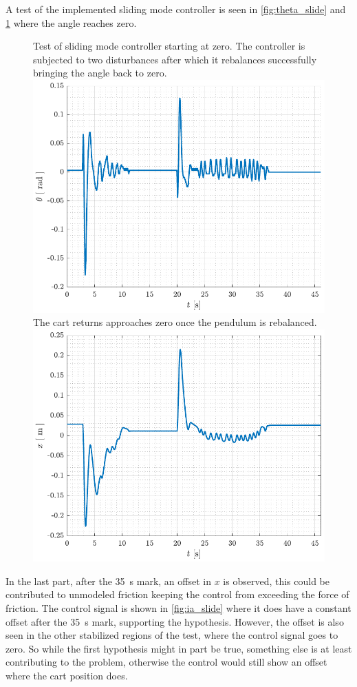 %
A test of the implemented sliding mode controller is seen in \autoref{fig:theta_slide} and \ref{fig:x_slide} where the angle reaches zero.
%
\begin{figure}[H]
  \hspace{1cm}
  \captionbox
  {
    Test of sliding mode controller starting at zero. The controller is subjected to two disturbances after which it rebalances successfully bringing the angle back to zero.
    \label{fig:theta_slide}
  }
  {
    \hspace{-1cm}
    \includegraphics[width=.4\textwidth]{figures/theta_slide}
  }
  \hspace{20pt}
  \captionbox 
  {
    The cart returns approaches zero once the pendulum is rebalanced.
    \label{fig:x_slide}
  }
  {
    \hspace{-1cm}
    \includegraphics[width=.4\textwidth]{figures/x_slide}
  }  
\end{figure}
In the last part, after the \SI{35}{s} mark, an offset in $x$ is observed, this could be contributed to unmodeled friction keeping the control from exceeding the force of friction. The control signal is shown in \autoref{fig:ia_slide} where it does have a constant offset after the \SI{35}{s} mark, supporting the hypothesis. However, the offset is also seen in the other stabilized regions of the test, where the control signal goes to zero. So while the first hypothesis might in part be true, something else is at least contributing to the problem, otherwise the control would still show an offset where the cart position does.
%
